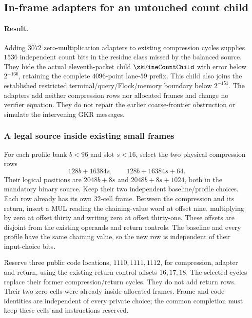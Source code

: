 \subsection{In-frame adapters for an untouched count child}\label{note:zk-count-adapter}

\paragraph{Result.} Adding $3072$ zero-multiplication adapters to existing compression cycles supplies $1536$ independent count bits in the residue class missed by the balanced source. They hide the actual eleventh-packet child $\zkFineCountChild$ with error below $2^{-160}$, retaining the complete $4096$-point lane-$59$ prefix. This child also joins the established restricted terminal/query/Flock/memory boundary below $2^{-151}$. The adapters add neither compression rows nor allocated frames and change no verifier equation. They do not repair the earlier coarse-frontier obstruction or simulate the intervening GKR messages.

\subsubsection{A legal source inside existing small frames}

For each profile bank $b<96$ and slot $s<16$, select the two physical compression rows
\[
 128b+16384s,\qquad 128b+16384s+64.
\]
Their logical positions are $2048b+8s$ and $2048b+8s+1024$, both in the mandatory binary source. Keep their two independent baseline/profile choices. Each row already has its own $32$-cell frame. Between the compression and its return, insert a MUL reading the chaining-value word at offset nine, multiplying by zero at offset thirty and writing zero at offset thirty-one. These offsets are disjoint from the existing operands and return controls. The baseline and every profile have the same chaining value, so the new row is independent of their input-choice bits.

Reserve three public code locations, $1110,1111,1112$, for compression, adapter and return, using the existing return-control offsets $16,17,18$. The selected cycles replace their former compression/return cycles. They do not add return rows. Their two zero cells were already inside allocated frames. Frame and code identities are independent of every private choice; the common completion must keep these cells and instructions reserved.

